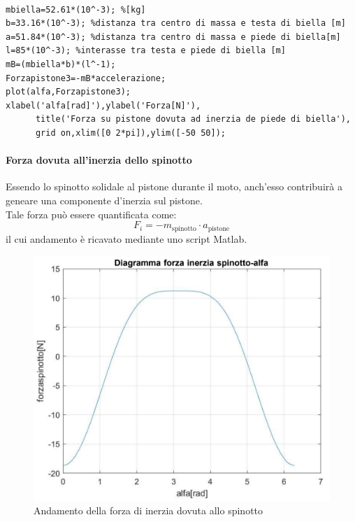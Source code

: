 \begin{lstlisting}[frame=trBL]
%Grafico forze di inerzia dovute alla massa del piede di biella

mbiella=52.61*(10^-3); %[kg]
b=33.16*(10^-3); %distanza tra centro di massa e testa di biella [m]
a=51.84*(10^-3); %distanza tra centro di massa e piede di biella[m]
l=85*(10^-3); %interasse tra testa e piede di biella [m]
mB=(mbiella*b)*(l^-1);
Forzapistone3=-mB*accelerazione;
plot(alfa,Forzapistone3);
xlabel('alfa[rad]'),ylabel('Forza[N]'),
      title('Forza su pistone dovuta ad inerzia de piede di biella'),
      grid on,xlim([0 2*pi]),ylim([-50 50]);
\end{lstlisting}
\paragraph{Forza dovuta all'inerzia dello spinotto} Essendo lo spinotto solidale al pistone durante il moto, anch’esso contribuirà a geneare una componente d’inerzia sul pistone. \\
Tale forza può essere quantificata come: 
\begin{equation}
    F_i=-m_{\mbox{spinotto}}\cdot a_{\mbox{pistone}}
\end{equation}
il cui andamento è ricavato mediante uno script Matlab.
\newpage
\begin{figure}[h]
    \centering
    \includegraphics[scale=0.5]{Immagini/GraficoInerziaSpinotto.png}
    \caption{Andamento della forza di inerzia dovuta allo spinotto}
    \label{fig:GraficoInerziaSpinotto}
\end{figure}

